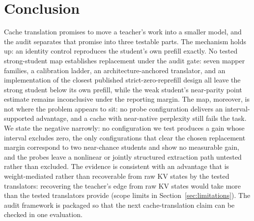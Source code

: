\documentclass{article} %
\begin{document}
\section{Conclusion}
Cache translation promises to move a teacher's work into a smaller model,
and the audit separates that promise into three testable parts. The
mechanism holds up: an identity control reproduces the student's own prefill
exactly. No tested strong-student map establishes replacement under the audit gate: seven mapper families, a
calibration ladder, an architecture-anchored translator, and an implementation
of the closest published strict-zero-reprefill design all leave the strong student below its own
prefill, while the weak student's near-parity point estimate remains
inconclusive under the reporting margin. The map, moreover, is not where the
problem appears to sit: no probe configuration delivers an interval-supported
advantage, and a cache with near-native perplexity still fails the
task. We state the negative narrowly: no configuration we test produces a gain
whose interval excludes zero, the only configurations that clear the chosen replacement margin correspond to two near-chance
students and show no measurable gain, and the probes leave
a nonlinear or jointly structured extraction path untested rather than
excluded. The evidence is consistent with an advantage that is weight-mediated
rather than recoverable from raw KV states by the tested translators:
recovering the teacher's edge from raw KV states would take
more than the tested translators provide (scope limits in
Section~\ref{sec:limitations}). The audit framework is
packaged so that the next cache-translation claim can be checked in one
evaluation.




\appendix
\end{document}
